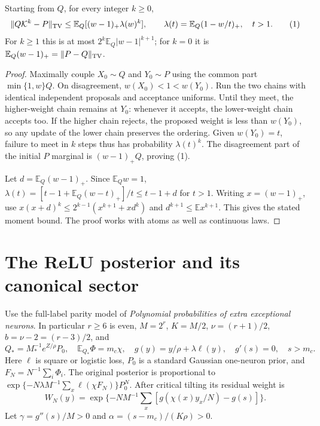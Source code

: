 \documentclass[11pt]{article}
\newcommand{\E}{\mathbb E}\newcommand{\R}{\mathbb R}
\begin{document}
\begin{lemma}\label{lem:imh}
Starting from $Q$, for every integer $k\ge0$,
\[
 \|Q\mathcal K^k-P\|_{\TV}
 \le \E_Q[(w-1)_+\lambda(w)^k],\qquad
 \lambda(t)=\E_Q(1-w/t)_+,\quad t>1.                    \tag{1}
\]
For $k\ge1$ this is at most $2^k\E_Q|w-1|^{k+1}$; for $k=0$ it is
$\E_Q(w-1)_+=\|P-Q\|_{\TV}$.
\end{lemma}
\begin{proof}
Maximally couple $X_0\sim Q$ and $Y_0\sim P$ using the common part
$\min\{1,w\}Q$. On disagreement, $w(X_0)<1<w(Y_0)$. Run the two
chains with identical independent proposals and acceptance uniforms.
Until they meet, the higher-weight chain remains at $Y_0$: whenever it
accepts, the lower-weight chain accepts too. If the higher chain rejects,
the proposed weight is less than $w(Y_0)$, so any update of the lower
chain preserves the ordering. Given $w(Y_0)=t$, failure to meet in $k$
steps thus has probability $\lambda(t)^k$. The disagreement part of
the initial $P$ marginal is $(w-1)_+Q$, proving (1).

Let $d=\E_Q(w-1)_+$. Since $\E_Qw=1$,
$\lambda(t)=[t-1+\E_Q(w-t)_+]/t\le t-1+d$ for $t>1$.
Writing $x=(w-1)_+$, use
$x(x+d)^k\le2^{k-1}(x^{k+1}+xd^k)$ and
$d^{k+1}\le\E x^{k+1}$. This gives the stated moment bound.
The proof works with atoms as well as continuous laws.
\end{proof}

\section{The ReLU posterior and its canonical sector}
Use the full-label parity model of \emph{Polynomial probabilities of
extra exceptional neurons}. In particular $r\ge6$ is even,
$M=2^r$, $K=M/2$, $\nu=(r+1)/2$, $b=\nu-2=(r-3)/2$, and
\[
 Q_*=M_*^{-1}e^{Z/\rho}P_0,\quad \E_{Q_*}\Phi=m_c\chi,\quad
 g(y)=y/\rho+\lambda\ell(y),\quad g'(s)=0,\quad s>m_c.
\]
Here $\ell$ is square or logistic loss, $P_0$ is a standard Gaussian
one-neuron prior, and $F_N=N^{-1}\sum_i\Phi_i$. The original posterior
is proportional to $\exp\{-N\lambda M^{-1}\sum_x\ell(\chi F_N)\}P_0^N$.
After critical tilting its residual weight is
\[
 W_N(y)=\exp\{-N M^{-1}\sum_x[g(\chi(x)y_x/N)-g(s)]\}.
 \tag{2}
\]
Let $\gamma=g''(s)/M>0$ and
$\alpha=(s-m_c)/(K\rho)>0$.
\end{document}
